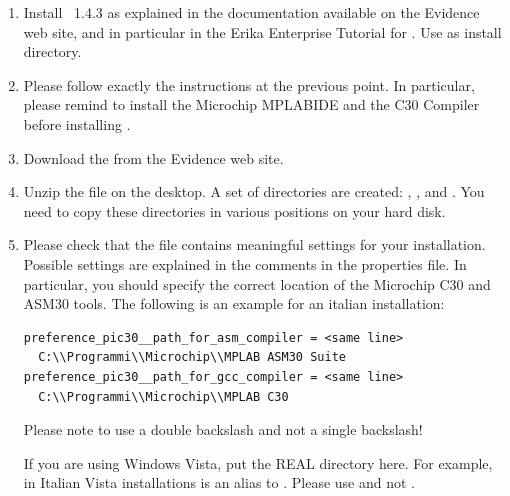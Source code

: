 \begin{enumerate}
\item Install \ee\ 1.4.3 as explained in the documentation available
  on the Evidence web site, and in particular in the Erika Enterprise
  Tutorial for \dspic. Use  as install directory.
\item Please follow exactly the instructions at the previous point. In
  particular, please remind to install the Microchip MPLABIDE and the
  C30 Compiler before installing \ee.
\item Download the  from the Evidence web site.
\item Unzip the file on the desktop. A set of directories are created:
  , , and . You need
  to copy these directories in various positions on your hard disk.
\item Please check that the file
  contains meaningful settings for your installation. Possible
  settings are explained in the comments in the properties file. In
  particular, you should specify the correct location of the Microchip
  C30 and ASM30 tools. The following is an example for an italian
  installation:
  \begin{lstlisting}
preference_pic30__path_for_asm_compiler = <same line>
  C:\\Programmi\\Microchip\\MPLAB ASM30 Suite
preference_pic30__path_for_gcc_compiler = <same line>
  C:\\Programmi\\Microchip\\MPLAB C30
  \end{lstlisting}

  Please note to use a double backslash and not a
  single backslash!
\begin{warning}
If you are using Windows Vista, put the REAL directory here. For example, in Italian Vista installations  is an alias to . Please use  and not .
\end{warning}


\end{enumerate}
